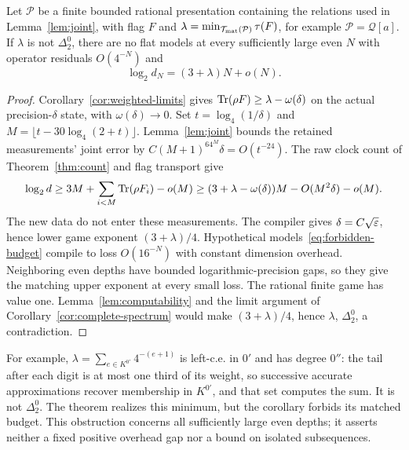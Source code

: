 \begin{corollary}\label{cor:budget-obstruction}
Let $\mathcal P$ be a finite bounded rational presentation containing the relations used in Lemma~\ref{lem:joint}, with flag $F$ and $\lambda=\min_{\mathcal T_{\rm mat}(\mathcal P)}\tau(F)$, for example $\mathcal P=\mathcal Q[a]$. If $\lambda$ is not $\Delta^0_2$, there are no flat models at every sufficiently large even $N$ with operator residuals $O(4^{-N})$ and
\begin{equation}\label{eq:forbidden-budget}
 \log_2d_N=(3+\lambda)N+o(N).
\end{equation}
\end{corollary}
\begin{proof}
Corollary~\ref{cor:weighted-limits} gives $\operatorname{Tr}(\rho F)\ge\lambda-\omega(\delta)$ on the actual precision-$\delta$ state, with $\omega(\delta)\to0$. Set $t=\log_4(1/\delta)$ and $M=\lfloor t-30\log_4(2+t)\rfloor$. Lemma~\ref{lem:joint} bounds the retained measurements' joint error by $C(M+1)^64^M\delta=O(t^{-24})$. The raw clock count of Theorem~\ref{thm:count} and flag transport give
\[
 \log_2d\ge3M+\sum_{i<M}\operatorname{Tr}(\rho F_i)-o(M)
 \ge(3+\lambda-\omega(\delta))M-O(M^2\delta)-o(M).
\]
The new data do not enter these measurements. The compiler gives $\delta=C\sqrt{\varepsilon}$, hence lower game exponent $(3+\lambda)/4$. Hypothetical models~\eqref{eq:forbidden-budget} compile to loss $O(16^{-N})$ with constant dimension overhead. Neighboring even depths have bounded logarithmic-precision gaps, so they give the matching upper exponent at every small loss. The rational finite game has value one. Lemma~\ref{lem:computability} and the limit argument of Corollary~\ref{cor:complete-spectrum} would make $(3+\lambda)/4$, hence $\lambda$, $\Delta^0_2$, a contradiction.
\end{proof}

For example, $\lambda=\sum_{e\in K^{0'}}4^{-(e+1)}$ is left-c.e. in $0'$ and has degree $0''$: the tail after each digit is at most one third of its weight, so successive accurate approximations recover membership in $K^{0'}$, and that set computes the sum. It is not $\Delta^0_2$. The theorem realizes this minimum, but the corollary forbids its matched budget. This obstruction concerns all sufficiently large even depths; it asserts neither a fixed positive overhead gap nor a bound on isolated subsequences.

